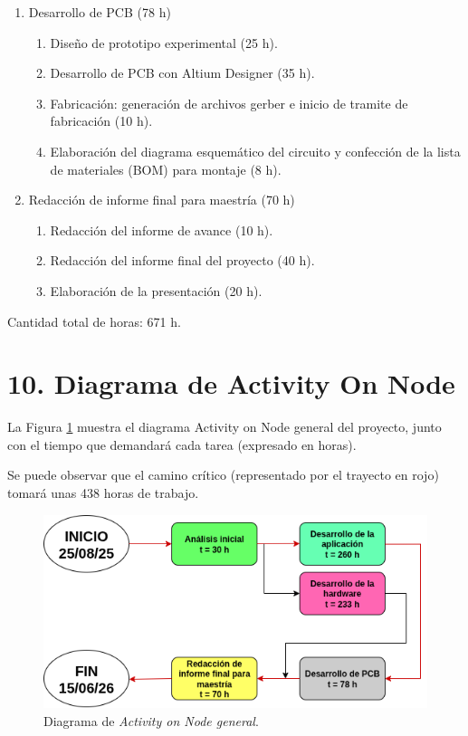 \documentclass[
11pt, %
]{charter}
\begin{document}
\begin{enumerate}
\item Desarrollo de PCB (78 h)
	\begin{enumerate}
		\item Diseño de prototipo experimental (25 h).
		\item Desarrollo de PCB con Altium Designer (35 h).
		\item Fabricación: generación de archivos gerber e inicio de tramite de fabricación (10 h).
		\item Elaboración del diagrama esquemático del circuito y confección de la lista de materiales (BOM) para montaje (8 h).
	\end{enumerate}
\item Redacción de informe final para maestría (70 h)
	\begin{enumerate}
		\item Redacción del informe de avance (10 h).
		\item Redacción del informe final del proyecto (40 h).
		\item Elaboración de la presentación (20 h).
	\end{enumerate}
\end{enumerate}

Cantidad total de horas: 671 h.

\section{10. Diagrama de Activity On Node}
\label{sec:AoN}

La Figura \ref{fig:aongeneral} muestra el diagrama Activity on Node general del proyecto, junto con el tiempo que demandará cada tarea (expresado en horas).

Se puede observar que el camino crítico (representado por el trayecto en rojo) tomará unas 438 horas de trabajo.

\begin{figure}[htpb]
\centering 
\includegraphics[width=.8\textwidth]{./Figuras/aon_general.png}
\caption{Diagrama de \textit{Activity on Node general}.}
\label{fig:aongeneral}
\end{figure}
\end{document}
